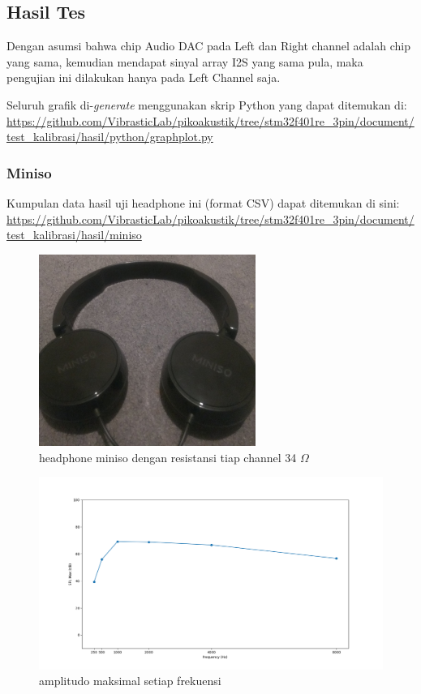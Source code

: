 \documentclass[12pt,]{article}
\begin{document}
	\subsection{Hasil Tes}
	
	Dengan asumsi bahwa chip Audio DAC pada Left dan Right channel adalah chip yang sama,
	kemudian mendapat sinyal array I2S yang sama pula,
	maka pengujian ini dilakukan hanya pada Left Channel saja.
	
	Seluruh grafik di-\textit{generate} menggunakan skrip Python yang dapat ditemukan di:\\
	\url{https://github.com/VibrasticLab/pikoakustik/tree/stm32f401re_3pin/document/test_kalibrasi/hasil/python/graphplot.py}
	
  	\subsubsection{Miniso}
  	
  	Kumpulan data hasil uji headphone ini (format CSV) dapat ditemukan di sini:\\
  	\url{https://github.com/VibrasticLab/pikoakustik/tree/stm32f401re_3pin/document/test_kalibrasi/hasil/miniso}
  	
  	\begin{figure}[!ht]
  		\centering
  		\includegraphics[width=200pt]{hasil/miniso/miniso}
  		\caption{headphone miniso dengan resistansi tiap channel 34 $\Omega$}
  	\end{figure}
	
	\newpage
	\begin{figure}[!ht]
		\centering
		\includegraphics[width=400pt]{hasil/miniso/allfreq/max_freq}
		\caption{amplitudo maksimal setiap frekuensi}
	\end{figure}
\end{document}

